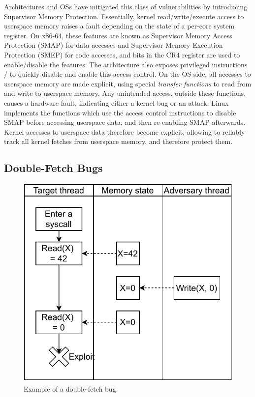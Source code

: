 \documentclass[letterpaper,twocolumn,10pt]{article}
\begin{document}
Architectures and OSs have mitigated this class of vulnerabilities
by introducing Supervisor Memory Protection.
Essentially, kernel read/write/execute access to userspace memory
raises a fault depending on the state of a per-core system 
register.
On x86-64, these features are known as Supervisor Memory Access 
Protection (SMAP) for data accesses and Supervisor Memory Execution 
Protection (SMEP) for code accesses, and bits in the CR4 register 
are used to enable/disable the features.
The architecture also exposes privileged instructions 
/ to quickly disable and enable this access 
control.
On the OS side, all accesses to userspace memory are made explicit, 
using special \emph{transfer functions} to read from and write to userspace memory.
Any unintended access, outside these functions, causes a 
hardware fault, indicating either a kernel bug or an attack.
Linux implements the functions  which 
use the access control instructions to disable SMAP before 
accessing userspace data, and then re-enabling SMAP afterwards.
Kernel accesses to userspace data therefore become explicit, allowing
\midas to reliably track all kernel fetches from userspace memory, 
and therefore protect them.


\subsection{Double-Fetch Bugs}

\begin{figure}[]
  \centering
  \includegraphics[width=.85\linewidth]{img/doublefetch.pdf}
  \caption{Example of a double-fetch bug.}
  \label{fig:doublefetch}
\end{figure}
\end{document}
